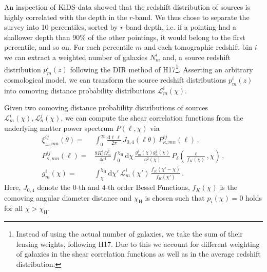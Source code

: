 \documentclass[referee]{aa} %
\renewcommand{\[}{\begin{equation}}
\renewcommand{\]}{\end{equation}}
\renewcommand{\rm}{\mathrm}
\begin{document}
An inspection of KiDS-data showed that the redshift distribution of sources is highly correlated with the depth in the $r$-band. We thus chose to separate the survey into 10 percentiles, sorted by $r$-band depth, i.e. if a pointing had a shallower depth than 90\% of the other pointings, it would belong to the first percentile, and so on. For each percentile $m$ and each tomographic redshift bin $i$ we can extract a weighted number of galaxies $N^i_m$ and, a source redshift distribution $p^i_m(z)$ following the DIR method of H17\footnote{Instead of using the actual number of galaxies, we take the sum of their lensing weights, following H17. Due to this we account for different weighting of galaxies in the shear correlation functions as well as in the average redshift distribution.}. Asserting an arbitrary cosmological model, we can transform the source redshift distributions $p^i_m(z)$ into comoving distance probability distributions $\mathcal{L}^i_m(\chi)$.

Given two comoving distance probability distributions of sources $\mathcal{L}^i_m(\chi),\mathcal{L}^j_n(\chi)$, we can compute the shear correlation functions from the underlying matter power spectrum $P(\ell,\chi)$ via \citep[compare][]{1992ApJ...388..272K} \begin{align}
\label{eq:xipm-pkappa}
\xi_{\pm,mn}^{ij}(\theta) =& \int_0^\infty \frac{{\rm d}\ell\,\ell}{2\pi}\, J_{0,4}(\ell\theta)\, P^{ij}_{\kappa,mn}(\ell)\, , \\
\label{eq:pkappa-pdelta/lenseff}
P^{ij}_{\kappa,mn}(\ell) =& \frac{9 H_0^4\Omega_{\rm m}^2}{4c^4}\int_0^{\chi_{\rm{H}}} {\rm d}\chi\, \frac{g^i_m(\chi)g^j_n(\chi)}{a^2(\chi)}\, P_\delta\left(\frac{\ell}{f_K(\chi)},\chi\right)\, , \\
\label{eq:lenseff}
g^i_m(\chi) =& \int_\chi^{\chi_{\rm{H}}} {\rm d}\chi' \, \mathcal{L}^i_m(\chi') \, \frac{f_K(\chi'-\chi)}{f_K(\chi')}\, .
\end{align}
Here, $J_{0,4}$ denote the 0-th and 4-th order Bessel Functions, $f_K(\chi)$ is the comoving angular diameter distance and $\chi_{\rm{H}}$ is chosen such that $p_i(\chi)=0$ holds for all $\chi>\chi_{\rm{H}}$.
\end{document}
